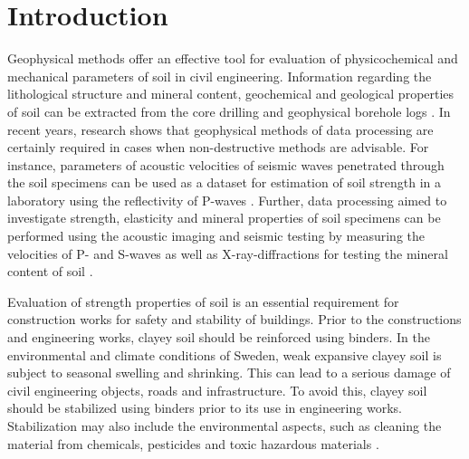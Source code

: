\documentclass[USenglish,twocolumn]{article}
\begin{document}



  
\maketitle

\section{Introduction}

Geophysical methods offer an effective tool for evaluation of physicochemical and mechanical parameters of soil in civil engineering. Information regarding the lithological structure and mineral content, geochemical and geological properties of soil can be extracted from the core drilling and geophysical borehole logs \cite{MAUCEC2009194,JING2021101534}. In recent years, research shows that geophysical methods of data processing are certainly required in cases when non-destructive methods are advisable. For instance, parameters of acoustic velocities of seismic waves penetrated through the soil specimens can be used as a dataset for estimation of soil strength in a laboratory using the reflectivity of P-waves \cite{Lindh202102,Lindh202210}. Further, data processing aimed to investigate strength, elasticity and mineral properties of soil specimens can be performed using the acoustic imaging and seismic testing by measuring the velocities of P- and S-waves \cite{Tang2009,Tronicke,Hadden} as well as X-ray-diffractions for testing the mineral content of soil \cite{Wang}. 

Evaluation of strength properties of soil is an essential requirement for construction works for safety and stability of buildings. Prior to the constructions and engineering works, clayey soil should be reinforced using binders. In the environmental and climate conditions of Sweden, weak expansive clayey soil is subject to seasonal swelling and shrinking. This can lead to a serious damage of civil engineering objects, roads and infrastructure. To avoid this, clayey soil should be stabilized using binders prior to its use in engineering works. Stabilization may also include the environmental aspects, such as cleaning the material from chemicals, pesticides \cite{CONTESSI2021141826,Lemenkova202222} and toxic hazardous materials  \cite{Lindh202201}. 
\end{document}
